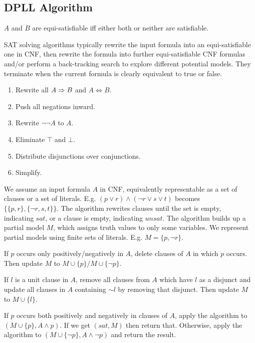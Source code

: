\subsection{DPLL Algorithm}
\begin{mytitle} $A$ and $B$ are equi-satisfiable iff either both or neither are satisfiable.
\end{mytitle}
\begin{mytitle} SAT solving algorithms typically rewrite the input formula into an equi-satisfiable one in CNF, then rewrite the formula into further equi-satisfiable CNF formulas and/or perform a back-tracking search to explore different potential models. They terminate when the current formula is clearly equivalent to true or false. 
\end{mytitle}
\begin{mytitle}\hfill
\begin{enumerate}
    \item Rewrite all $A\Rightarrow B$ and $A \Leftrightarrow B$.
    \item Push all negations inward.
    \item Rewrite $\lnot\lnot A$ to $A$.
    \item Eliminate $\top$ and $\bot$.
    \item Distribute disjunctions over conjunctions.
    \item Simplify.
\end{enumerate}
\end{mytitle}
\begin{mytitle} We assume an input formula $A$ in CNF, equivalently representable as a set of clauses or a set of literals. E.g. $(p\lor r) \land (\lnot r\lor s\lor t)$ becomes $\{\{p,r\}, \{\lnot r, s, t\}\}$. The algorithm rewrites clauses until the set is empty, indicating $sat$, or a clause is empty, indicating $unsat$. The algorithm builds up a partial model $M$, which assigns truth values to only some variables. We represent partial models using finite sets of literals. E.g. $M = \{p, \lnot r\}$.
    \begin{mysubtitle} If $p$ occurs only positively/negatively in $A$, delete clauses of $A$ in which $p$ occurs. Then update $M$ to $M\cup \{p\} /M\cup \{\lnot p\}$.
    \end{mysubtitle}
    \begin{mysubtitle} If $l$ is a unit clause in $A$, remove all clauses from $A$ which have $l$ as a disjunct and update all clauses in $A$ containing $\sim l$ by removing that disjunct. Then update $M$ to $M\cup\{l\}$.
    \end{mysubtitle}
    \begin{mysubtitle}[Decision] If $p$ occurs both positively and negatively in clauses of $A$, apply the algorithm to $(M\cup \{p\}, A\land p)$. If we get $(sat, M)$ then return that. Otherwise, apply the algorithm to $(M\cup \{\lnot p\}, A\land \lnot p)$ and return the result.
    \end{mysubtitle}
\end{mytitle}
